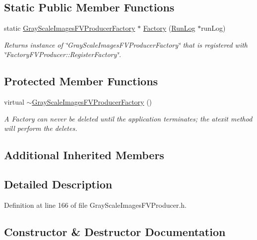 \subsection*{Static Public Member Functions}
\begin{DoxyCompactItemize}
\item 
static \hyperlink{class_k_k_m_l_l_1_1_gray_scale_images_f_v_producer_factory}{Gray\+Scale\+Images\+F\+V\+Producer\+Factory} $\ast$ \hyperlink{class_k_k_m_l_l_1_1_gray_scale_images_f_v_producer_factory_ae0082a1fd20abb831f0217f642156936}{Factory} (\hyperlink{class_k_k_b_1_1_run_log}{Run\+Log} $\ast$run\+Log)
\begin{DoxyCompactList}\small\item\em Returns instance of \char`\"{}\+Gray\+Scale\+Images\+F\+V\+Producer\+Factory\char`\"{} that is registered with \char`\"{}\+Factory\+F\+V\+Producer\+::\+Register\+Factory\char`\"{}. \end{DoxyCompactList}\end{DoxyCompactItemize}
\subsection*{Protected Member Functions}
\begin{DoxyCompactItemize}
\item 
virtual \hyperlink{class_k_k_m_l_l_1_1_gray_scale_images_f_v_producer_factory_a3f2e0ff89e08978eeb47efd95ce6679c}{$\sim$\+Gray\+Scale\+Images\+F\+V\+Producer\+Factory} ()
\begin{DoxyCompactList}\small\item\em A Factory can never be deleted until the application terminates; the atexit method will perform the deletes. \end{DoxyCompactList}\end{DoxyCompactItemize}
\subsection*{Additional Inherited Members}


\subsection{Detailed Description}


Definition at line 166 of file Gray\+Scale\+Images\+F\+V\+Producer.\+h.



\subsection{Constructor \& Destructor Documentation}
